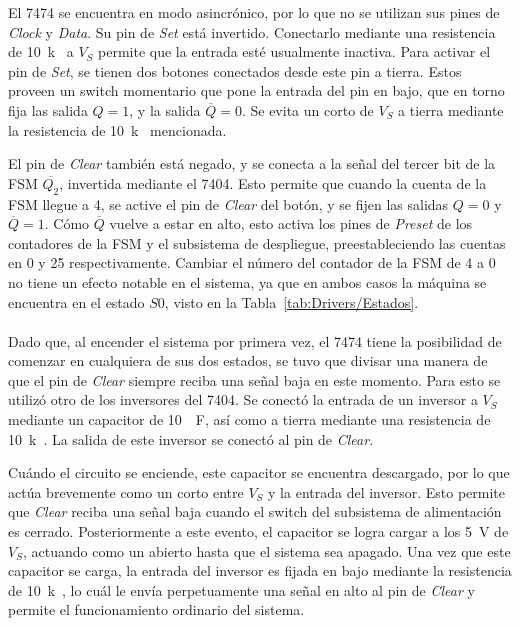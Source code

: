 \documentclass[12pt,onecolumn]{IEEEtran}
\begin{document}
El 7474 se encuentra en modo asincrónico, por lo que no se utilizan sus pines de \textit{Clock} y \textit{Data}. Su pin de \textit{Set} está invertido. Conectarlo mediante una resistencia de \qty{10}{k\Omega} a $V_S$ permite que la entrada esté usualmente inactiva. Para activar el pin de \textit{Set}, se tienen dos botones conectados desde este pin a tierra. Estos proveen un switch momentario que pone la entrada del pin en bajo, que en torno fija las salida $Q=1$, y la salida $\overline{Q}=0$. Se evita un corto de $V_S$ a tierra mediante la resistencia de \qty{10}{k\Omega} mencionada.

El pin de \textit{Clear} también está negado, y se conecta a la señal del tercer bit de la FSM $\overline{Q_2}$, invertida mediante el 7404. Esto permite que cuando la cuenta de la FSM llegue a 4, se active el pin de \textit{Clear} del botón, y se fijen las salidas $Q=0$ y $\overline{Q}=1$. Cómo $\overline{Q}$ vuelve a estar en alto, esto activa los pines de \textit{Preset} de los contadores de la FSM y el subsistema de despliegue, preestableciendo las cuentas en 0 y 25 respectivamente. Cambiar el número del contador de la FSM de 4 a 0 no tiene un efecto notable en el sistema, ya que en ambos casos la máquina se encuentra en el estado $S0$, visto en la Tabla~\ref{tab:Drivers/Estados}.
\\
\\

Dado que, al encender el sistema por primera vez, el 7474 tiene la posibilidad de comenzar en cualquiera de sus dos estados, se tuvo que divisar una manera de que el pin de \textit{Clear} siempre reciba una señal baja en este momento. Para esto se utilizó otro de los inversores del 7404. Se conectó la entrada de un inversor a $V_S$ mediante un capacitor de \qty{10}{\mu F}, así como a tierra mediante una resistencia de \qty{10}{k\Omega}. La salida de este inversor se conectó al pin de \textit{Clear}.

Cuándo el circuito se enciende, este capacitor se encuentra descargado, por lo que actúa brevemente como un corto entre $V_S$ y la entrada del inversor. Esto permite que \textit{Clear} reciba una señal baja cuando el switch del subsistema de alimentación es cerrado. Posteriormente a este evento, el capacitor se logra cargar a los \qty{5}{V} de $V_S$, actuando como un abierto hasta que el sistema sea apagado. Una vez que este capacitor se carga, la entrada del inversor es fijada en bajo mediante la resistencia de \qty{10}{k\Omega}, lo cuál le envía perpetuamente una señal en alto al pin de \textit{Clear} y permite el funcionamiento ordinario del sistema. 
\end{document}
